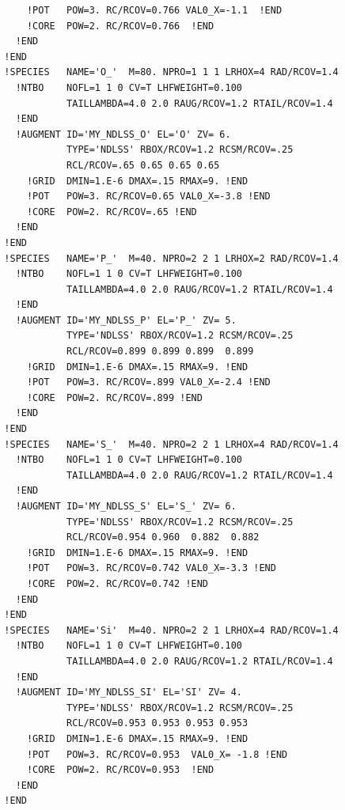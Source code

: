 \documentclass{book}
\begin{document}
{\begin{verbatim}
      !POT   POW=3. RC/RCOV=0.766 VAL0_X=-1.1  !END
      !CORE  POW=2. RC/RCOV=0.766  !END
    !END
  !END
  !SPECIES   NAME='O_'  M=80. NPRO=1 1 1 LRHOX=4 RAD/RCOV=1.4
    !NTBO    NOFL=1 1 0 CV=T LHFWEIGHT=0.100
             TAILLAMBDA=4.0 2.0 RAUG/RCOV=1.2 RTAIL/RCOV=1.4 
    !END 
    !AUGMENT ID='MY_NDLSS_O' EL='O' ZV= 6.
             TYPE='NDLSS' RBOX/RCOV=1.2 RCSM/RCOV=.25
             RCL/RCOV=.65 0.65 0.65 0.65
      !GRID  DMIN=1.E-6 DMAX=.15 RMAX=9. !END
      !POT   POW=3. RC/RCOV=0.65 VAL0_X=-3.8 !END
      !CORE  POW=2. RC/RCOV=.65 !END
    !END
  !END
  !SPECIES   NAME='P_'  M=40. NPRO=2 2 1 LRHOX=2 RAD/RCOV=1.4
    !NTBO    NOFL=1 1 0 CV=T LHFWEIGHT=0.100
             TAILLAMBDA=4.0 2.0 RAUG/RCOV=1.2 RTAIL/RCOV=1.4 
    !END 
    !AUGMENT ID='MY_NDLSS_P' EL='P_' ZV= 5.
             TYPE='NDLSS' RBOX/RCOV=1.2 RCSM/RCOV=.25
             RCL/RCOV=0.899 0.899 0.899  0.899 
      !GRID  DMIN=1.E-6 DMAX=.15 RMAX=9. !END
      !POT   POW=3. RC/RCOV=.899 VAL0_X=-2.4 !END
      !CORE  POW=2. RC/RCOV=.899 !END
    !END
  !END
  !SPECIES   NAME='S_'  M=40. NPRO=2 2 1 LRHOX=4 RAD/RCOV=1.4
    !NTBO    NOFL=1 1 0 CV=T LHFWEIGHT=0.100
             TAILLAMBDA=4.0 2.0 RAUG/RCOV=1.2 RTAIL/RCOV=1.4 
    !END 
    !AUGMENT ID='MY_NDLSS_S' EL='S_' ZV= 6.
             TYPE='NDLSS' RBOX/RCOV=1.2 RCSM/RCOV=.25
             RCL/RCOV=0.954 0.960  0.882  0.882
      !GRID  DMIN=1.E-6 DMAX=.15 RMAX=9. !END
      !POT   POW=3. RC/RCOV=0.742 VAL0_X=-3.3 !END
      !CORE  POW=2. RC/RCOV=0.742 !END
    !END
  !END
  !SPECIES   NAME='Si'  M=40. NPRO=2 2 1 LRHOX=4 RAD/RCOV=1.4
    !NTBO    NOFL=1 1 0 CV=T LHFWEIGHT=0.100
             TAILLAMBDA=4.0 2.0 RAUG/RCOV=1.2 RTAIL/RCOV=1.4 
    !END 
    !AUGMENT ID='MY_NDLSS_SI' EL='SI' ZV= 4.
             TYPE='NDLSS' RBOX/RCOV=1.2 RCSM/RCOV=.25
             RCL/RCOV=0.953 0.953 0.953 0.953 
      !GRID  DMIN=1.E-6 DMAX=.15 RMAX=9. !END
      !POT   POW=3. RC/RCOV=0.953  VAL0_X= -1.8 !END
      !CORE  POW=2. RC/RCOV=0.953  !END
    !END
  !END
\end{verbatim}
}




\end{document}
